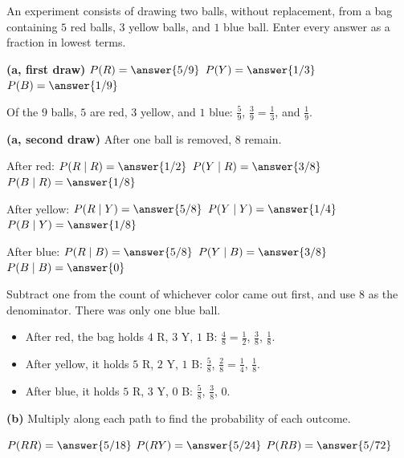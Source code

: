 \documentclass[12pt]{ximera}
\begin{document}
\begin{problem}
An experiment consists of drawing two balls, without replacement, from a bag
containing $5$ red balls, $3$ yellow balls, and $1$ blue ball. Enter every answer as a
fraction in lowest terms.

\begin{prompt}
\textbf{(a, first draw)} $P(R)=\answer{5/9}$ \qquad $P(Y)=\answer{1/3}$ \qquad
$P(B)=\answer{1/9}$

\begin{feedback}
Of the $9$ balls, $5$ are red, $3$ yellow, and $1$ blue: $\frac59$, $\frac39=\frac13$,
and $\frac19$.
\end{feedback}
\end{prompt}

\begin{prompt}
\textbf{(a, second draw)} After one ball is removed, $8$ remain.

After red: \quad $P(R\mid R)=\answer{1/2}$ \quad $P(Y\mid R)=\answer{3/8}$ \quad
$P(B\mid R)=\answer{1/8}$

\smallskip
After yellow: \quad $P(R\mid Y)=\answer{5/8}$ \quad $P(Y\mid Y)=\answer{1/4}$ \quad
$P(B\mid Y)=\answer{1/8}$

\smallskip
After blue: \quad $P(R\mid B)=\answer{5/8}$ \quad $P(Y\mid B)=\answer{3/8}$ \quad
$P(B\mid B)=\answer{0}$

\begin{hint}
Subtract one from the count of whichever color came out first, and use $8$ as the
denominator. There was only one blue ball.
\end{hint}

\begin{feedback}
\begin{itemize}
\item After red, the bag holds $4$ R, $3$ Y, $1$ B: $\frac48=\frac12$, $\frac38$, $\frac18$.
\item After yellow, it holds $5$ R, $2$ Y, $1$ B: $\frac58$, $\frac28=\frac14$, $\frac18$.
\item After blue, it holds $5$ R, $3$ Y, $0$ B: $\frac58$, $\frac38$, $0$.
\end{itemize}
\end{feedback}
\end{prompt}

\begin{prompt}
\textbf{(b)} Multiply along each path to find the probability of each outcome.

$P(RR)=\answer{5/18}$ \quad $P(RY)=\answer{5/24}$ \quad $P(RB)=\answer{5/72}$


\end{prompt}
\end{problem}
\end{document}
